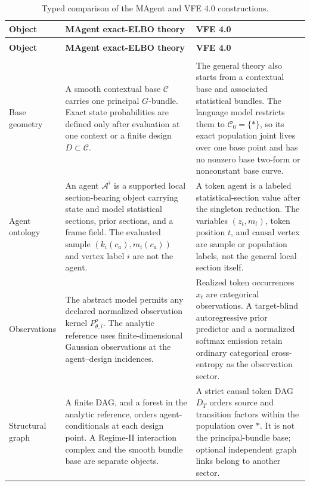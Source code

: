\small
\begin{longtable}{>{\raggedright\arraybackslash}p{}>{\raggedright\arraybackslash}p{}>{\raggedright\arraybackslash}p{}}
\caption{Typed comparison of the MAgent and VFE 4.0 constructions.}
\label{tab:magent-vfe4-comparison}\\
\toprule
\textbf{Object} & \textbf{MAgent exact-ELBO theory} & \textbf{VFE 4.0} \\
\midrule
\endfirsthead
\multicolumn{3}{l}{\textit{Table \thetable\ continued}}\\
\toprule
\textbf{Object} & \textbf{MAgent exact-ELBO theory} & \textbf{VFE 4.0} \\
\midrule
\endhead
\midrule
\multicolumn{3}{r}{\textit{Continued on next page}}\\
\endfoot
\bottomrule
\endlastfoot
Base geometry & A smooth contextual base \(\mathcal C\) carries one principal \(G\)-bundle. Exact state probabilities are defined only after evaluation at one context or a finite design \(D\subset\mathcal C\). & The general theory also starts from a contextual base and associated statistical bundles. The language model restricts them to \(\mathcal C_0=\{\ast\}\), so its exact population joint lives over one base point and has no nonzero base two-form or nonconstant base curve. \\
\addlinespace
Agent ontology & An agent \(\mathcal A^i\) is a supported local section-bearing object carrying state and model statistical sections, prior sections, and a frame field. The evaluated sample \((k_i(c_a),m_i(c_a))\) and vertex label \(i\) are not the agent. & A token agent is a labeled statistical-section value after the singleton reduction. The variables \((z_t,m_t)\), token position \(t\), and causal vertex are sample or population labels, not the general local section itself. \\
\addlinespace
Observations & The abstract model permits any declared normalized observation kernel \(P^o_{\theta,i}\). The analytic reference uses finite-dimensional Gaussian observations at the agent--design incidences. & Realized token occurrences \(x_t\) are categorical observations. A target-blind autoregressive prior predictor and a normalized softmax emission retain ordinary categorical cross-entropy as the observation sector. \\
\addlinespace
Structural graph & A finite DAG, and a forest in the analytic reference, orders agent-conditionals at each design point. A Regime-II interaction complex and the smooth bundle base are separate objects. & A strict causal token DAG \(D_T\) orders source and transition factors within the population over \(\ast\). It is not the principal-bundle base; optional independent graph links belong to another sector. \\

\end{longtable}
